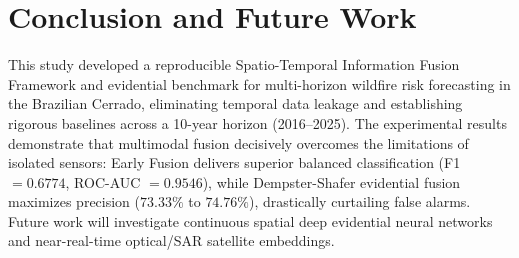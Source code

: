 \documentclass[runningheads]{llncs}
\begin{document}
\section{Conclusion and Future Work}
\label{sec:conclusion}
This study developed a reproducible Spatio-Temporal Information Fusion Framework and evidential benchmark for multi-horizon wildfire risk forecasting in the Brazilian Cerrado, eliminating temporal data leakage and establishing rigorous baselines across a 10-year horizon (2016--2025). The experimental results demonstrate that multimodal fusion decisively overcomes the limitations of isolated sensors: Early Fusion delivers superior balanced classification (F1 $= 0.6774$, ROC-AUC $= 0.9546$), while Dempster-Shafer evidential fusion maximizes precision ($73.33\%$ to $74.76\%$), drastically curtailing false alarms. Future work will investigate continuous spatial deep evidential neural networks and near-real-time optical/SAR satellite embeddings.
\end{document}

